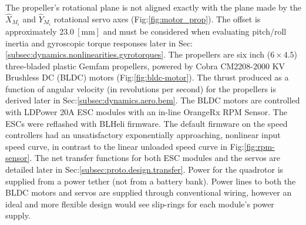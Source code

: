 The propeller's rotational plane is not aligned exactly with the plane made by the $\hat{X}_{M_i}$ and $\hat{Y}_{M_i}$ rotational servo axes (Fig:\ref{fig:motor_prop}). The offset is approximately $23.0~[\text{mm}]$ and must be considered when evaluating pitch/roll inertia and gyroscopic torque responses later in Sec:\ref{subsec:dynamics.nonlinearities.gyrotorques}. The propellers are six inch ($6 \times 4.5$) three-bladed plastic Gemfam propellers, powered by Cobra CM2208-2000 KV Brushless DC (BLDC) motors (Fig:\ref{fig:bldc-motor}). The thrust produced as a function of angular velocity (in revolutions per second) for the propellers is derived later in Sec:\ref{subsec:dynamics.aero.bem}. 
\newpage
The BLDC motors are controlled with LDPower 20A ESC modules with an in-line OrangeRx RPM Sensor. The ESCs were reflashed with BLHeli\cite{BLHeli} firmware. The default firmware on the speed controllers had an unsatisfactory exponentially approaching, nonlinear input speed curve, in contrast to the linear unloaded speed curve in Fig:\ref{fig:rpm-sensor}. The net transfer functions for both ESC modules and the servos are detailed later in Sec:\ref{subsec:proto.design.transfer}. Power for the quadrotor is supplied from a power tether (not from a battery bank). Power lines to both the BLDC motors and servos are supplied through conventional wiring, however an ideal and more flexible design would see slip-rings for each module's power supply. 
